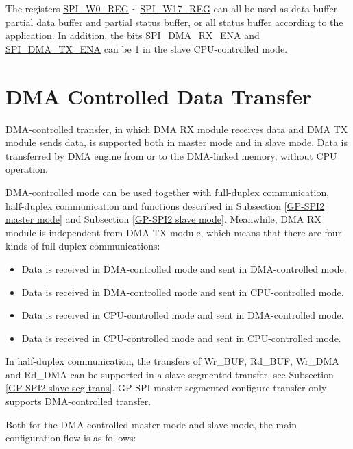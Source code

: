 \documentclass[main\_\_EN.tex]{subfiles}
\begin{document}
The registers \hyperref[regdesc:SPIW0REG]{SPI\_W0\_REG} \verb+~+ \hyperref[regdesc:SPIW17REG]{SPI\_W17\_REG} can all be used as data buffer, partial data buffer and partial status buffer, or all status buffer according to the application. In addition, the bits \hyperref[fielddesc:SPIDMARXENA]{SPI\_DMA\_RX\_ENA} and \hyperref[fielddesc:SPIDMATXENA]{SPI\_DMA\_TX\_ENA} can be 1 in the slave CPU-controlled mode.


\section{DMA Controlled Data Transfer}\label{Subsection:Usage of GP-SPI2 DMA controlled mode}

DMA-controlled transfer, in which DMA RX module receives data and DMA TX module sends data, is supported both in master mode and in slave mode. Data is transferred by DMA engine from or to the DMA-linked memory, without CPU operation.

DMA-controlled mode can be used together with full-duplex communication, half-duplex communication and functions described in Subsection \ref{GP-SPI2 master mode} and Subsection \ref{GP-SPI2 slave mode}. Meanwhile, DMA RX module is independent from DMA TX module, which means that there are four kinds of full-duplex communications:

\begin{itemize}
    \item Data is received in DMA-controlled mode and sent in DMA-controlled mode.

    \item Data is received in DMA-controlled mode and sent in CPU-controlled mode.

    \item Data is received in CPU-controlled mode and sent in DMA-controlled mode.

    \item Data is received in CPU-controlled mode and sent in CPU-controlled mode.

\end{itemize}

In half-duplex communication, the transfers of Wr\_BUF, Rd\_BUF, Wr\_DMA and Rd\_DMA can be supported in a slave segmented-transfer, see Subsection \ref{GP-SPI2 slave seg-trans}. GP-SPI master segmented-configure-transfer only supports DMA-controlled transfer.

Both for the DMA-controlled master mode and slave mode, the main configuration flow is as follows:
\end{document}
